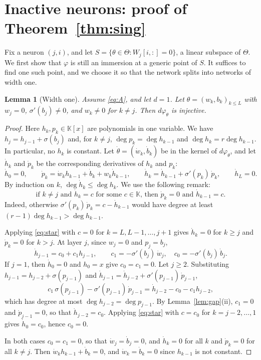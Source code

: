 \documentclass[11pt]{article}
\newtheorem{lemma}{Lemma}
\theoremstyle{definition}
\theoremstyle{remark}
\newcommand{\K}{\mathbb{K}}
\begin{document}
\section{Inactive neurons: proof of Theorem~\ref{thm:sing}}

Fix a neuron $(j,i)$, and let $S=\{\theta\in\Theta:W_j[i,:]=0\}$, a linear subspace of $\Theta$. We first show that $\varphi$ is still an immersion at a generic point of $S$. It suffices to find one such point, and we choose it so that the network splits into networks of width one.

\begin{lemma}[Width one]\label{lem:one}
Assume \eqref{eq:A}, and let $d=1$. Let $\theta=(w_k,b_k)_{k\le L}$ with $w_j=0$, $\sigma'(b_j)\ne0$, and $w_k\ne0$ for $k\ne j$. Then $d\varphi_\theta$ is injective.
\end{lemma}

\begin{proof}
Here $h_k,p_k\in\K[x]$ are polynomials in one variable. We have $h_j=h_{j-1}+\sigma(b_j)$ and, for $k\ne j$, $\deg p_k=\deg h_{k-1}$ and $\deg h_k=r\deg h_{k-1}$. In particular, no $h_k$ is constant. Let $\dot\theta=(\dot w_k,\dot b_k)$ be in the kernel of $d\varphi_\theta$, and let $\dot h_k$ and $\dot p_k$ be the corresponding derivatives of $h_k$ and $p_k$:
\[
\dot h_0=0,\qquad\dot p_k=\dot w_kh_{k-1}+\dot b_k+w_k\dot h_{k-1},\qquad\dot h_k=\dot h_{k-1}+\sigma'(p_k)\,\dot p_k,\qquad\dot h_L=0.
\]
By induction on $k$, $\deg\dot h_k\le\deg h_k$. We use the following remark:
\begin{equation*}\tag{$\ast$}\label{eq:star}
\text{if $k\ne j$ and $\dot h_k=c$ for some $c\in\K$, then $\dot p_k=0$ and $\dot h_{k-1}=c$.}
\end{equation*}
Indeed, otherwise $\sigma'(p_k)\,\dot p_k=c-\dot h_{k-1}$ would have degree at least $(r-1)\deg h_{k-1}>\deg h_{k-1}$.

Applying \eqref{eq:star} with $c=0$ for $k=L,L-1,\dots,j+1$ gives $\dot h_k=0$ for $k\ge j$ and $\dot p_k=0$ for $k>j$. At layer $j$, since $w_j=0$ and $p_j=b_j$,
\[
\dot h_{j-1}=c_0+c_1h_{j-1},\qquad c_1=-\sigma'(b_j)\,\dot w_j,\quad c_0=-\sigma'(b_j)\,\dot b_j.
\]
If $j=1$, then $\dot h_0=0$ and $h_0=x$ give $c_0=c_1=0$. Let $j\ge2$. Substituting $h_{j-1}=h_{j-2}+\sigma(p_{j-1})$ and $\dot h_{j-1}=\dot h_{j-2}+\sigma'(p_{j-1})\,\dot p_{j-1}$,
\[
c_1\,\sigma(p_{j-1})-\sigma'(p_{j-1})\,\dot p_{j-1}=\dot h_{j-2}-c_0-c_1h_{j-2},
\]
which has degree at most $\deg h_{j-2}=\deg p_{j-1}$. By Lemma~\ref{lem:gap}(ii), $c_1=0$ and $\dot p_{j-1}=0$, so that $\dot h_{j-2}=c_0$. Applying \eqref{eq:star} with $c=c_0$ for $k=j-2,\dots,1$ gives $\dot h_0=c_0$, hence $c_0=0$.

In both cases $c_0=c_1=0$, so that $\dot w_j=\dot b_j=0$, and $\dot h_k=0$ for all $k$ and $\dot p_k=0$ for all $k\ne j$. Then $\dot w_kh_{k-1}+\dot b_k=0$, and $\dot w_k=\dot b_k=0$ since $h_{k-1}$ is not constant.
\end{proof}
\end{document}

